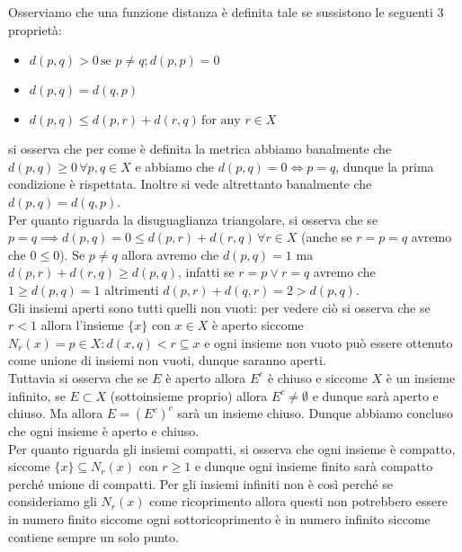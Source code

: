 \documentclass{report}
\begin{document}
\begin{mysolution}
Osserviamo che una funzione distanza è definita tale se sussistono le seguenti 3 proprietà:
\begin{itemize}
	\item $d(p, q) > 0 \, \text{se } p \neq q; d(p, p) = 0$
	\item $d(p, q) = d(q, p)$
	\item $d(p, q) \leq d(p, r) + d(r, q) \, \text{for any } r \in X$
\end{itemize}
si osserva che per come è definita la metrica abbiamo banalmente che $d(p, q) \geq 0 \, \forall p, q \in X$ e abbiamo che $d(p, q) = 0 \iff p=q$, dunque la prima condizione è rispettata. Inoltre si vede altrettanto banalmente che $d(p, q) = d(q,p)$. \\
Per quanto riguarda la disuguaglianza triangolare, si osserva che se $p = q \implies d(p, q) = 0 \leq d(p, r) + d(r, q) \, \forall r \in X$ (anche se $r = p = q$ avremo che $0 \leq 0$). Se $p \neq q$ allora avremo che $d(p, q) = 1$ ma $d(p, r) + d(r, q) \geq d(p, q)$, infatti se $r = p \vee r = q$ avremo che $1 \geq d(p, q) = 1$ altrimenti $d(p, r) + d(q, r) = 2 > d(p, q)$. \\
Gli insiemi aperti sono tutti quelli non vuoti: per vedere ciò si osserva che se $r < 1$ allora l'insieme $\{x\}$ con $x \in X$ è aperto siccome $N_r(x) = {p \in X: d(x, q) < r} \subseteq {x}$ e ogni insieme non vuoto può essere ottenuto come unione di insiemi non vuoti, dunque saranno aperti. \\
Tuttavia si osserva che se $E$ è aperto allora $E^c$ è chiuso e siccome $X$ è un insieme infinito, se $E \subset X$ (sottoinsieme proprio) allora $E^c \neq \emptyset$ e dunque sarà aperto e chiuso. Ma allora $E = (E^c)^c$ sarà un insieme chiuso. Dunque abbiamo concluso che ogni insieme è aperto e chiuso. \\
Per quanto riguarda gli insiemi compatti, si osserva che ogni insieme è compatto, siccome $\{ x \} \subseteq N_r(x)$ con $r \geq 1$ e dunque ogni insieme finito sarà compatto perché unione di compatti. Per gli insiemi infiniti non è così perché se consideriamo gli $N_r(x)$ come ricoprimento allora questi non potrebbero essere in numero finito siccome ogni sottoricoprimento è in numero infinito siccome contiene sempre un solo punto.
\end{mysolution}
\end{document}
